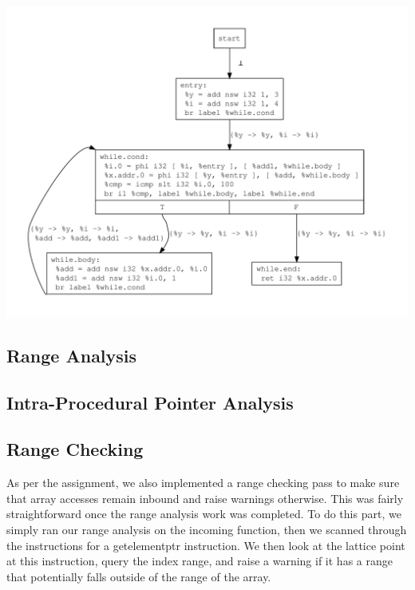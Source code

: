\documentclass{article}
\theoremstyle{definition}
\begin{document}
\includegraphics[scale=.4]{figures/cse/loop/loop-no-do-cse.pdf}
\subsection{Range Analysis}
\subsection{Intra-Procedural Pointer Analysis}

\subsection{Range Checking}

As per the assignment, we also implemented a range checking pass to make sure that array accesses remain inbound and raise warnings otherwise. This was fairly straightforward once the range analysis work was completed. To do this part, we simply ran our range analysis on the incoming function, then we scanned through the instructions for a getelementptr instruction. We then look at the lattice point at this instruction, query the index range, and raise a warning if it has a range that potentially falls outside of the range of the array.
\end{document}

